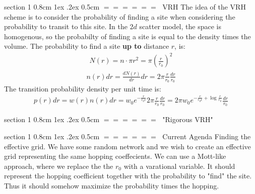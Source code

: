 \documentclass[onecolumn,fleqn,notitlepage,secnumarabic]{revtex4}
\makeatletter
\def\section{%
  \@startsection
    {section}%
    {1}%
    {\z@}%
    {0.8cm \@plus1ex \@minus .2ex}%
    {0.5cm}%
    {\Large\bf $=\!=\!=\!=\!=\!=\;$}%
}%
\makeatother
\begin{document}
\section{VRH}
The idea of the VRH scheme is to consider the probability of finding a site when considering the probability to transit to this site. In the $2d$ scatter model, the space is homogenous, so the probabilty of finding a site is equal to the density times the volume. The probability to find a site {\bf up to} distance $r$, is:
\begin{align}   N(r) = n\cdot \pi r^2 = \pi \left(\frac{r}{r_0}\right)^2\end{align}  
\begin{align}   n(r)dr = \frac{dN(r)}{dr}dr = 2\pi \frac{r}{r_0}\frac{dr}{r_0}\end{align}  
The transition probability density per unit time is:
\begin{align}  p(r)dr = w(r)n(r)dr = w_0 e^{-\frac{r}{r_0\epsilon}}2\pi \frac{r}{r_0}\frac{dr}{r_0}=2\pi w_0 e^{-\frac{r}{r_0\epsilon} + \log\frac{r}{r_0}}\frac{dr}{r_0}
\end{align}  

\section{"Rigorous VRH"}


%
\section{Current Agenda}
Finding the effective grid. We have some random network and we wish to create an effective grid representing the same hopping coeffecients. We can use a Mott-like approach, where we replace the the $r_0$ with a varational variable. It should represent the hopping coefficient together with the probability to "find" the site. Thus it should somehow maximize the probability times the hopping. 



%

\end{document}
